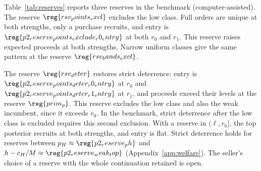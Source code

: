 Table~\ref{tab:reserves} reports three reserves in the benchmark (computer-assisted). The reserve
\(\reg{rsv_points_excl}\) excludes the low class. Full orders are unique at both strengths, only a purchase recruits,
and entry is \(\reg{p2_reserve_points_exclude_r0_entry}\) at both \(r_0\) and \(r_1\). This reserve raises expected
proceeds at both strengths. Narrow uniform classes give the same pattern at the reserve \(\reg{rsv_bands_excl}\).

The reserve \(\reg{rsv_deter}\) restores strict deterrence: entry is \(\reg{p2_reserve_points_deter_r0_entry}\) at
\(r_0\) and \(\reg{p2_reserve_points_deter_r1_entry}\) at \(r_1\), and proceeds exceed their levels at the reserve
\(\reg{prim_p}\). This reserve excludes the low class and also the weak incumbent, since it exceeds \(r_0\). In the
benchmark, strict deterrence after the low class is excluded requires this second exclusion. With a reserve in
\((\ell,r_0]\), the top posterior recruits at both strengths, and entry is flat. Strict deterrence holds for reserves
between \(p_H\approx\reg{p2_reserve_ph}\) and \(h-c_H/M\approx\reg{p2_reserve_weak_top}\) (Appendix~\ref{app:welfare}).
The seller's choice of a reserve with the whole continuation retained is open.
